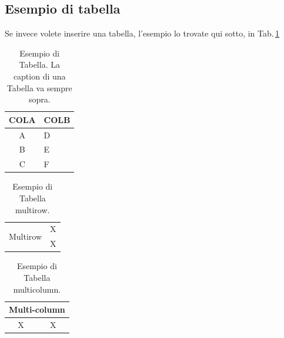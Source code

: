 \subsection{Esempio di tabella}\label{subsec:esempio_tabella}
Se invece volete inserire una tabella, l'esempio lo trovate qui sotto, in Tab.\,\ref{tab:esempio_tab}

\begin{table}[ht]
    \centering
    \caption{Esempio di Tabella. La caption di una Tabella va sempre sopra.}
    \label{tab:esempio_tab}
    \begin{tabular}{cl}
    \toprule
    COLA & COLB   \\
    \midrule
    A & D   \\
    B & E   \\
    C & F   \\
    \bottomrule
    \end{tabular}
\end{table}

\begin{table}[ht]
\centering
    \caption{Esempio di Tabella multirow.}
    \label{tab:esempio_tab_multirow}
    \begin{tabular}{cc}
    \toprule
    \multirow{2}{*}{Multirow}&X\\
    &X\\
    \bottomrule
    \end{tabular}
\end{table}

\begin{table}[!ht]
\centering
    \caption{Esempio di Tabella multicolumn.}
    \label{tab:esempio_tab_multicolumn}
    \begin{tabular}{cc}
    \toprule
    \multicolumn{2}{c}{Multi-column}\\
    \midrule
    X&X\\
    \bottomrule
    \end{tabular}
\end{table}
